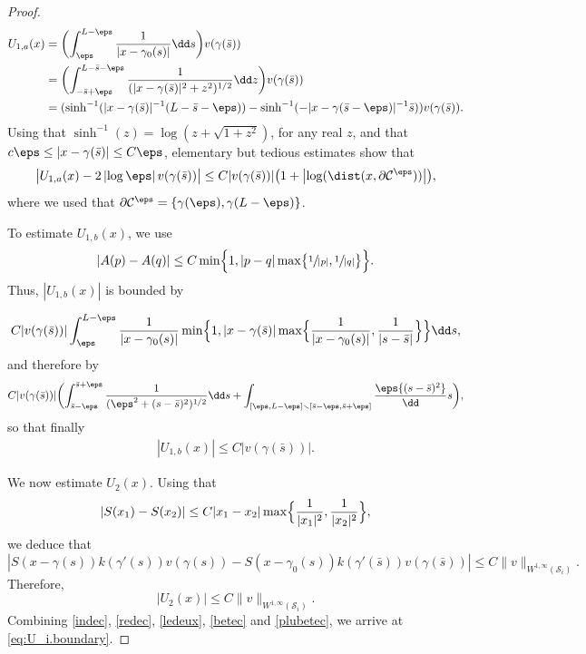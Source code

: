 \begin{proof}
\begin{align}
\nonumber
U_{1,a} (x) &=
\biggl(\int_\eps^{L-\eps} \frac 1 {|x - \gamma_0(s)|} \dd s \biggr) v(\gamma (\bar s))
\\\label{here}
&= \biggl(\int_{- \bar s + \eps}^{L - \bar s - \eps} \frac{1}{(|x - \gamma(\bar s)|^2 + z^2)^{1/2}} \dd z \biggr) v(\gamma (\bar s))
\\ \nonumber
&= (\sinh^{-1}(|x - \gamma(\bar s)|^{-1} (L- \bar s - \eps)) - \sinh^{-1}(- |x - \gamma(\bar s - \eps)|^{-1} \bar s)) v(\gamma (\bar s)).
\end{align}
Using that $\sinh^{-1}(z) = \log(z + \sqrt{1 + z^2})$, for any real $z$, and that $c \eps \leq |x - \gamma(\bar s)| \leq C \eps$, elementary but tedious estimates show
that
\begin{equation}
\label{ledeux}
\big|U_{1,a} (x) - 2 \left|\log \eps \right| v(\gamma (\bar s))\big| \leq C |v(\gamma (\bar s))| { \bigl(1 + \left|\log(\dist(x,\partial \mathcal C^\eps))\right| \bigr)},
\end{equation}
{where we used that $\partial \mathcal C^\eps = \{\gamma(\eps),\gamma(L - \eps)\}$.}

To estimate $U_{1,b} (x)$, we use
\begin{equation}
|A(p) - A(q)| \leq C \min\Bigl\{ 1, |p-q| \max \bigl\{\sfrac 1 {|p|}, \sfrac 1 {|q|} \bigr\} \Bigr\}.
\end{equation}
Thus, $ |U_{1,b} (x)| $ is bounded by

\begin{gather*}
C {|v(\gamma (\bar s))|} \int_\eps^{L-\eps} \frac 1 {|x - \gamma_0(s)|} \min\Bigl\{ 1, |x - \gamma(\bar s)| \max \Bigl\{\frac 1 {|x - \gamma_0(s)|}, \frac 1 {|s-\bar s|} \Bigr\} \Bigr\} \dd s,
\end{gather*}
and therefore by
\begin{gather*}
C{|v(\gamma (\bar s))|} \biggl(\int_{\bar s - \eps}^{\bar s + \eps} \frac 1 {(\eps^2 + (s - \bar s)^2)^{1/2}} \dd s + \int_{[\eps,L -\eps] \smallsetminus [\bar s - \eps, \bar s + \eps]} \frac \eps {(s - \bar s)^2} \dd s \biggr),
\end{gather*}
so that finally
\begin{gather}
\label{betec}
|U_{1,b} (x)| \leq C {|v(\gamma (\bar s))|}.
\end{gather}

We now estimate $U_2 (x)$.
Using that
\begin{equation}
|S(x_1) - S(x_2)| \leq C |x_1 - x_2| \max \Bigl\{\frac 1 {|x_1|^2}, \frac 1 {|x_2|^2} \Bigr\},
\end{equation}
we deduce that
\begin{equation*}
|S(x - \gamma(s)) k(\gamma'(s)) v(\gamma (s)) - S(x - \gamma_0(s)) k(\gamma'(\bar s)) v(\gamma (\bar s))|
\leq C{\|v\|_{W^{1,\infty} (\mathcal S_i)}}.
\end{equation*}
Therefore,
\begin{equation}
\label{plubetec}
|U_2 (x) |\leq C{\|v\|_{W^{1,\infty} (\mathcal S_i)}}.
\end{equation}
Combining \eqref{indec}, \eqref{redec}, \eqref{ledeux}, \eqref{betec} and \eqref{plubetec}, we arrive at \eqref{eq:U_i.boundary}.
\end{proof}


